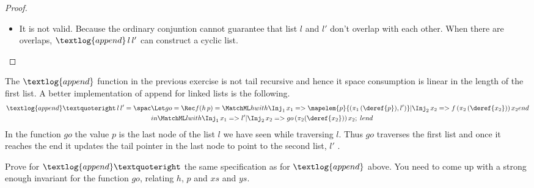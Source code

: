 \begin{proof}
\begin{itemize}
    \item It is not valid. Because the ordinary conjuntion cannot guarantee that
      list $l$ and $l'$ don't overlap with each other. When there are overlaps,
      $\textlog{append}\, l\, l'$ can construct a cyclic list.
  \end{itemize}
\end{proof}

\begin{exercise}
  The $\textlog{append}$ function in the previous exercise is not tail recursive
  and hence it space consumption is linear in the length of the first list. A
  better implementation of append for linked lists is the following.
  \begin{align*}
    \textlog{append}’\, l\, l'= \spac & \Let go=\Rec f(h\, p)=
    \MatchML h with
    \Inj_1\, x_1=>\mapelem{p}{(\pi_1\, (\deref{p}), l')}
    | \Inj_2\, x_2=>f\, (\pi_2\, (\deref{x_2}))\, x_2
    end {} \\
    & in \MatchML l with
    \Inj_1\, x_1=>l'
    | \Inj_2\, x_2=>go\, (\pi_2 (\deref{x_2}))\, x_2;\; l
    end {}
  \end{align*}
  In the function $go$ the value $p$ is the last node of the list $l$ we have seen
  while traversing $l$. Thus $go$ traverses the first list and once it reaches the
  end it updates the tail pointer in the last node to point to the second list,
  $l'$ .

  Prove for $\textlog{append}’$ the same specification as for $\textlog{append}$
  above. You need to come up with a strong enough invariant for the function $go$,
  relating $h$, $p$ and $xs$ and $ys$.
\end{exercise}


